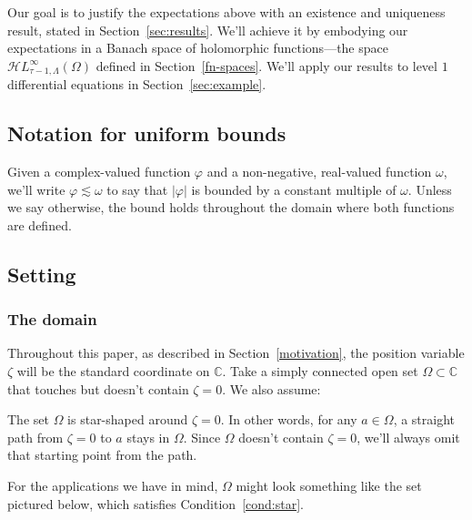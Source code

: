 \documentclass{article}
\makeatletter
\theoremstyle{plain}
\newcommand{\cond}[1]{\item[(\textsc{#1})]\protected@edef\@currentlabel{\textsc{#1}}}
\newcommand{\C}{\mathbb{C}}
\newcommand{\singexp}[2]{\mathcal{H}L^\infty_{#1, #2}}
\newcommand{\domain}{\Omega}
\makeatother
\begin{document}
Our goal is to justify the expectations above with an existence and uniqueness result, stated in Section~\ref{sec:results}. We'll achieve it by embodying our expectations in a Banach space of holomorphic functions---the space $\singexp{\tau-1}{\Lambda}(\domain)$ defined in Section~\ref{fn-spaces}. We'll apply our results to level $1$ differential equations in Section~\ref{sec:example}.
\subsection{Notation for uniform bounds}
Given a complex-valued function $\varphi$ and a non-negative, real-valued function $\omega$, we'll write $\varphi \lesssim \omega$ to say that $|\varphi|$ is bounded by a constant multiple of $\omega$. Unless we say otherwise, the bound holds throughout the domain where both functions are defined.
\subsection{Setting}\label{setting}
\subsubsection{The domain}\label{setting:domain}
Throughout this paper, as described in Section~\ref{motivation}, the position variable $\zeta$ will be the standard coordinate on $\C$. Take a simply connected open set $\domain \subset \C$ that touches but doesn't contain $\zeta = 0$. We also assume:
\begin{conditions}
\cond{star}\label{cond:star} The set $\domain$ is star-shaped around $\zeta = 0$. In other words, for any $a \in \domain$, a straight path from $\zeta = 0$ to $a$ stays in $\domain$. Since $\domain$ doesn't contain $\zeta = 0$, we'll always omit that starting point from the path.
\end{conditions}
For the applications we have in mind, $\domain$ might look something like the set pictured below, which satisfies Condition~\eqref{cond:star}.
\begin{center}
\end{center}
\end{document}
